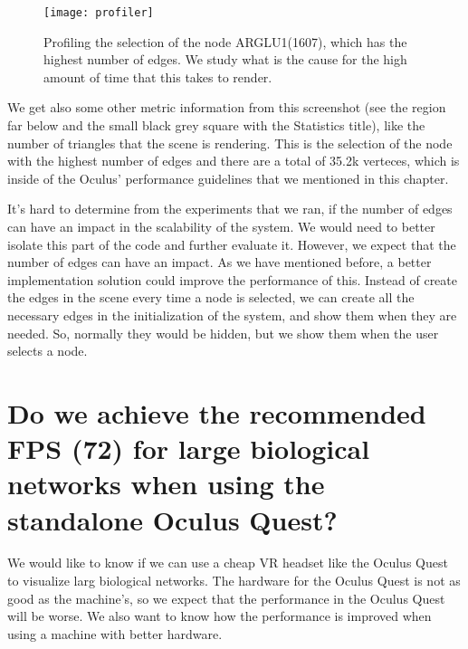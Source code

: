 \begin{figure}
    \centering%
    \texttt{[image: profiler]}
    \caption{Profiling the selection of the node ARGLU1(1607), which has the highest number of edges. We study what is the cause for the high amount of time that this takes to render.}
    \label{fig:profiler}
\end{figure}%

We get also some other metric information from this screenshot (see the region far below and the small black grey square with the Statistics title), like the number of triangles that the scene is rendering. This is the selection of the node with the highest number of edges and there are a total of 35.2k verteces, which is inside of the Oculus' performance guidelines that we mentioned in this chapter.

It's hard to determine from the experiments that we ran, if the number of edges can have an impact in the scalability of the system. We would need to better isolate this part of the code and further evaluate it. However, we expect that the number of edges can have an impact. As we have mentioned before, a better implementation solution could improve the performance of this. Instead of create the edges in the scene every time a node is selected, we can create all the necessary edges in the initialization of the system, and show them when they are needed. So, normally they would be hidden, but we show them when the user selects a node.

%

\section{Do we achieve the recommended FPS (72) for large biological networks when using the standalone Oculus Quest?}
We would like to know if we can use a cheap VR headset like the Oculus Quest to visualize larg biological networks. The hardware for the Oculus Quest is not as good as the machine's, so we expect that the performance in the Oculus Quest will be worse. We also want to know how the performance is improved when using a machine with better hardware.

